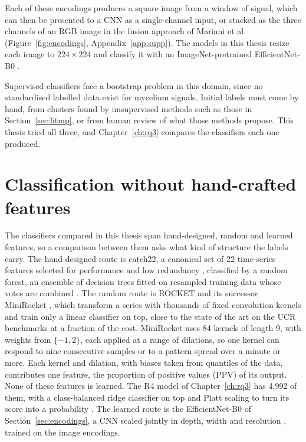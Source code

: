 Each of these encodings produces a square image from a window of signal, which can then be presented to a CNN as a single-channel input, or stacked as the three channels of an RGB image in the fusion approach of Mariani et al.\ \cite{mariani} (Figure~\ref{fig:encodings}, Appendix~\ref{app:supp}). The models in this thesis resize each image to $224\times224$ and classify it with an ImageNet-pretrained EfficientNet-B0 \cite{tan2019efficientnet}.

Supervised classifiers face a bootstrap problem in this domain, since no standardised labelled data exist for mycelium signals. Initial labels must come by hand, from clusters found by unsupervised methods such as those in Section~\ref{sec:litmp}, or from human review of what those methods propose. This thesis tried all three, and Chapter~\ref{ch:rq3} compares the classifiers each one produced.

\section{Classification without hand-crafted features}
\label{sec:litclassifiers}
\label{sec:minirocket}

The classifiers compared in this thesis span hand-designed, random and learned features, so a comparison between them asks what kind of structure the labels carry. The hand-designed route is catch22, a canonical set of 22 time-series features selected for performance and low redundancy \cite{lubba2019catch22}, classified by a random forest, an ensemble of decision trees fitted on resampled training data whose votes are combined \cite{breiman2001rf}. The random route is ROCKET \cite{dempster2020rocket} and its successor MiniRocket \cite{dempster2021minirocket}, which transform a series with thousands of fixed convolution kernels and train only a linear classifier on top, close to the state of the art on the UCR benchmarks at a fraction of the cost. MiniRocket uses 84 kernels of length 9, with weights from $\{-1, 2\}$, each applied at a range of dilations, so one kernel can respond to nine consecutive samples or to a pattern spread over a minute or more. Each kernel and dilation, with biases taken from quantiles of the data, contributes one feature, the proportion of positive values (PPV) of its output. None of these features is learned. The R4 model of Chapter~\ref{ch:rq3} has 4,992 of them, with a class-balanced ridge classifier on top and Platt scaling to turn its score into a probability \cite{platt1999}. The learned route is the EfficientNet-B0 of Section~\ref{sec:encodings}, a CNN scaled jointly in depth, width and resolution \cite{tan2019efficientnet}, trained on the image encodings.

